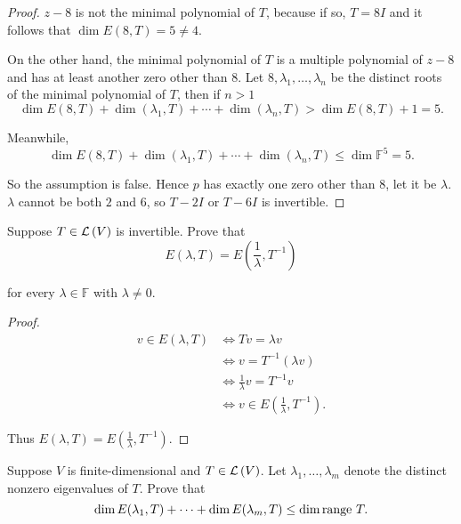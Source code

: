\begin{proof}
    $z - 8$ is not the minimal polynomial of $T$, because if so, $T = 8I$ and it follows that $\dim E(8, T) = 5\ne 4$.

    On the other hand, the minimal polynomial of $T$ is a multiple polynomial of $z - 8$ and has at least another zero other than $8$. Let $8, \lambda_{1}, \ldots, \lambda_{n}$ be the distinct roots of the minimal polynomial of $T$, then if $n > 1$
    \[
        \dim E(8, T) + \dim (\lambda_{1}, T) + \cdots + \dim (\lambda_{n}, T) > \dim E(8, T) + 1 = 5.
    \]

    Meanwhile,
    \[
        \dim E(8, T) + \dim (\lambda_{1}, T) + \cdots + \dim (\lambda_{n}, T) \leq \dim \mathbb{F}^{5} = 5.
    \]

    So the assumption is false. Hence $p$ has exactly one zero other than $8$, let it be $\lambda$. $\lambda$ cannot be both $2$ and $6$, so $T - 2I$ or $T - 6I$ is invertible.
\end{proof}
\newpage

\begin{exercise}
    Suppose $T\in\mathcal{L}\left({V}\right)$ is invertible. Prove that
    \[
        E(\lambda, T) = E\left(\frac{1}{\lambda}, T^{-1}\right)
    \]

    for every $\lambda\in\mathbb{F}$ with $\lambda\ne 0$.
\end{exercise}

\begin{proof}
    \begin{align*}
        v\in E(\lambda, T) & \Longleftrightarrow Tv = \lambda v                                \\
                           & \Longleftrightarrow v = T^{-1}(\lambda v)                         \\
                           & \Longleftrightarrow \frac{1}{\lambda}v = T^{-1}v                  \\
                           & \Longleftrightarrow v\in E\left(\frac{1}{\lambda}, T^{-1}\right).
    \end{align*}

    Thus $E(\lambda, T) = E\left(\frac{1}{\lambda}, T^{-1}\right)$.
\end{proof}
\newpage

\begin{exercise}
    Suppose $V$ is finite-dimensional and $T\in\mathcal{L}\left({V}\right)$. Let $\lambda_{1}, \ldots, \lambda_{m}$ denote the distinct nonzero eigenvalues of $T$. Prove that
    \[
        \dim E(\lambda_{1}, T) + \cdots + \dim E(\lambda_{m}, T)\leq \dim\operatorname{range}\,{T}.
    \]
\end{exercise}

